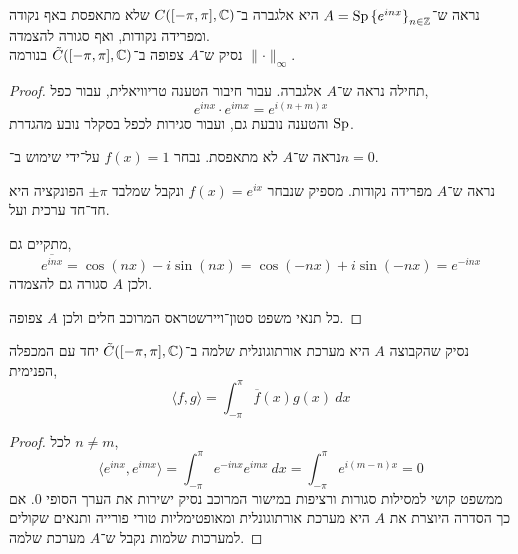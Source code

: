 \question{}
\subquestion{}
נראה ש־$A = \operatorname{Sp} {\{ e^{in x} \}}_{n \in \mathbb{Z}}$ היא אלגברה ב־$C([-\pi, \pi], \mathbb{C})$ שלא מתאפסת באף נקודה ומפרידה נקודות, ואף סגורה להצמדה. \\
נסיק ש־$A$ צפופה ב־$\tilde{C}([-\pi, \pi], \mathbb{C})$ בנורמה $\lVert \cdot \rVert_\infty$.
\begin{proof}
	תחילה נראה ש־$A$ אלגברה.
	עבור חיבור הטענה טריוויאלית, עבור כפל,
	\[
		e^{i n x} \cdot e^{i m x}
		= e^{i (n + m) x}
	\]
	והטענה נובעת גם, ועבור סגירות לכפל בסקלר נובע מהגדרת $\operatorname{Sp}$.

	נראה ש־$A$ לא מתאפסת.
	נבחר $f(x) = 1$ על־ידי שימוש ב־$n = 0$.

	נראה ש־$A$ מפרידה נקודות.
	מספיק שנבחר $f(x) = e^{i x}$ ונקבל שמלבד $\pm \pi$ הפונקציה היא חד־חד ערכית ועל.

	מתקיים גם,
	\[
		\overline{e^{i n x}}
		= \cos(n x) - i \sin(n x)
		= \cos(- n x) + i \sin (- n x)
		= e^{-i n x}
	\]
	ולכן $A$ סגורה גם להצמדה.

	כל תנאי משפט סטון־ויירשטראס המרוכב חלים ולכן $A$ צפופה.
\end{proof}

\subquestion{}
נסיק שהקבוצה $A$ היא מערכת אורתוגונלית שלמה ב־$\tilde{C}([-\pi, \pi], \mathbb{C})$ יחד עם המכפלה הפנימית,
\[
	\langle f, g \rangle
	= \int_{-\pi}^{\pi} \overline{f}(x) g(x)\ dx 
\]
\begin{proof}
	לכל $n \ne m$,
	\[
		\langle e^{i n x}, e^{i m x} \rangle
		= \int_{-\pi}^{\pi} e^{-i n x} e^{i m x}\ dx
		= \int_{-\pi}^{\pi} e^{i (m - n) x}
		= 0
	\]
	ממשפט קושי למסילות סגורות ורציפות במישור המרוכב נסיק ישירות את הערך הסופי $0$.
	אם כך הסדרה היוצרת את $A$ היא מערכת אורתוגונלית ומאופטימליות טורי פורייה ותנאים שקולים למערכות שלמות נקבל ש־$A$ מערכת שלמה.
\end{proof}

